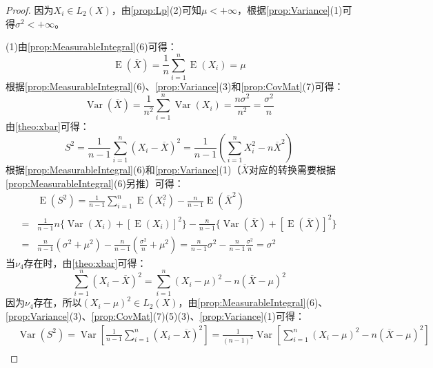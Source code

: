 \begin{proof}
	因为$X_i\in L_2(X)$，由\cref{prop:Lp}(2)可知$\mu<+\infty$，根据\cref{prop:Variance}(1)可得$\sigma^2<+\infty$。\par
	(1)由\cref{prop:MeasurableIntegral}(6)可得：
	\begin{equation*}
		\operatorname{E}(\overline{X})=\frac{1}{n}\sum_{i=1}^{n}\operatorname{E}(X_i)=\mu
	\end{equation*}
	根据\cref{prop:MeasurableIntegral}(6)、\cref{prop:Variance}(3)和\cref{prop:CovMat}(7)可得：
	\begin{equation*}
		\operatorname{Var}(\overline{X})=\frac{1}{n^2}\sum_{i=1}^{n}\operatorname{Var}(X_i)=\frac{n\sigma^2}{n^2}=\frac{\sigma^2}{n}
	\end{equation*}
	由\cref{theo:xbar}可得：
	\begin{equation*}
		S^2=\frac{1}{n-1}\sum_{i=1}^{n}(X_i-\overline{X})^2=\frac{1}{n-1}\left(\sum_{i=1}^{n}X_i^2-n\overline{X}^2\right)
	\end{equation*}
	根据\cref{prop:MeasurableIntegral}(6)和\cref{prop:Variance}(1)（$\overline{X}$对应的转换需要根据\cref{prop:MeasurableIntegral}(6)另推）可得：
	\begin{align*}
		&\operatorname{E}(S^2)=\frac{1}{n-1}\sum_{i=1}^{n}\operatorname{E}(X_i^2)-\frac{n}{n-1}\operatorname{E}(\overline{X}^2) \\
		=&\frac{1}{n-1}n\{\operatorname{Var}(X_i)+[\operatorname{E}(X_i)]^2\}-\frac{n}{n-1}\{\operatorname{Var}(\overline{X})+[\operatorname{E}(\overline{X})]^2\} \\
		=&\frac{n}{n-1}(\sigma^2+\mu^2)-\frac{n}{n-1}\left(\frac{\sigma^2}{n}+\mu^2\right)=\frac{n}{n-1}\sigma^2-\frac{n}{n-1}\frac{\sigma^2}{n}=\sigma^2
	\end{align*}
	当$\nu_4$存在时，由\cref{theo:xbar}可得：
	\begin{equation*}
		\sum_{i=1}^{n}(X_i-\overline{X})^2=\sum_{i=1}^{n}(X_i-\mu)^2-n(\overline{X}-\mu)^2
	\end{equation*}
	因为$\nu_4$存在，所以$(X_i-\mu)^2\in L_2(X)$，由\cref{prop:MeasurableIntegral}(6)、\cref{prop:Variance}(3)、\cref{prop:CovMat}(7)(5)(3)、\cref{prop:Variance}(1)可得：
	\begin{align*}
		&\operatorname{Var}(S^2)=\operatorname{Var}\left[\frac{1}{n-1}\sum_{i=1}^{n}(X_i-\overline{X})^2\right]=\frac{1}{(n-1)^2}\operatorname{Var}\left[\sum_{i=1}^{n}(X_i-\mu)^2-n(\overline{X}-\mu)^2\right] \\

\end{align*}
\end{proof}
